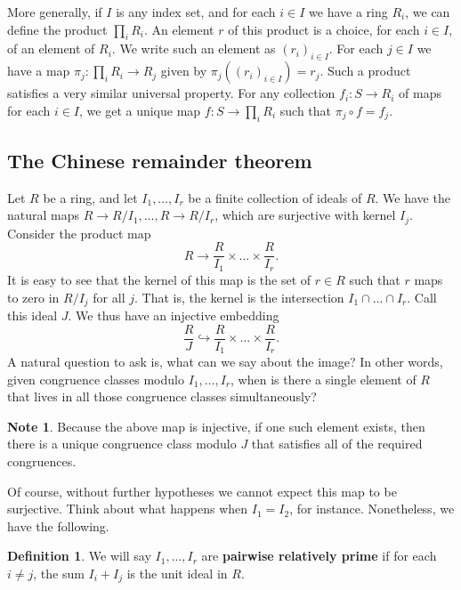 \documentclass{article}
\newcommand{\rb}[1]{\left( #1 \right)}
\theoremstyle{definition}\newtheorem{definition}{Definition}[subsection]
\theoremstyle{definition}\newtheorem{remark}[definition]{Remark}
\theoremstyle{definition}\newtheorem*{example}{Example}
\theoremstyle{definition}\newtheorem*{note}{Note}
\begin{document}
More generally, if $ I $ is any index set, and for each $ i \in I $ we have a ring $ R_i $, we can define the product $ \prod_i R_i $. An element $ r $ of this product is a choice, for each $ i \in I $, of an element of $ R_i $. We write such an element as $ \rb{r_i}_{i \in I} $. For each $ j \in I $ we have a map $ \pi_j : \prod_i R_i \to R_j $ given by $ \pi_j\rb{\rb{r_i}_{i \in I}} = r_j $. Such a product satisfies a very similar universal property. For any collection $ f_i : S \to R_i $ of maps for each $ i \in I $, we get a unique map $ f : S \to \prod_i R_i $ such that $ \pi_j \circ f = f_j $.

\subsection{The Chinese remainder theorem}

Let $ R $ be a ring, and let $ I_1, \dots, I_r $ be a finite collection of ideals of $ R $. We have the natural maps $ R \to R / I_1, \dots, R \to R / I_r $, which are surjective with kernel $ I_j $. Consider the product map
$$ R \to \dfrac{R}{I_1} \times \dots \times \dfrac{R}{I_r}. $$
It is easy to see that the kernel of this map is the set of $ r \in R $ such that $ r $ maps to zero in $ R / I_j $ for all $ j $. That is, the kernel is the intersection $ I_1 \cap \dots \cap I_r $. Call this ideal $ J $. We thus have an injective embedding
$$ \dfrac{R}{J} \hookrightarrow \dfrac{R}{I_1} \times \dots \times \dfrac{R}{I_r}. $$
A natural question to ask is, what can we say about the image? In other words, given congruence classes modulo $ I_1, \dots, I_r $, when is there a single element of $ R $ that lives in all those congruence classes simultaneously?

\begin{note}
Because the above map is injective, if one such element exists, then there is a unique congruence class modulo $ J $ that satisfies all of the required congruences.
\end{note}

Of course, without further hypotheses we cannot expect this map to be surjective. Think about what happens when $ I_1 = I_2 $, for instance. Nonetheless, we have the following.

\begin{definition}
We will say $ I_1, \dots, I_r $ are \textbf{pairwise relatively prime} if for each $ i \ne j $, the sum $ I_i + I_j $ is the unit ideal in $ R $.
\end{definition}
\end{document}
